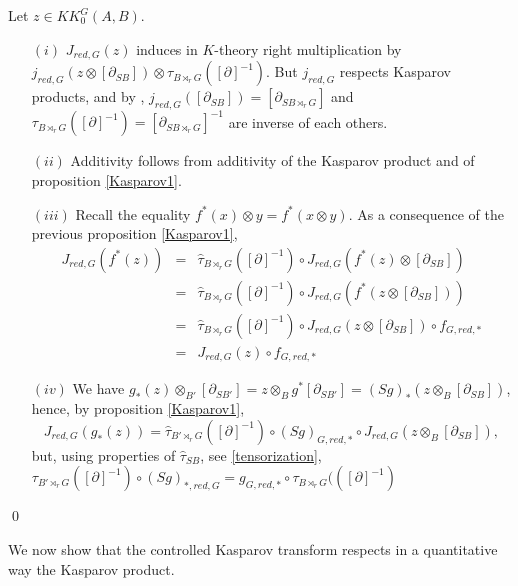 \begin{dem} Let $z\in KK_0^G(A,B)$.
\begin{itemize}
\item[$(i)$] $J_{red,G}(z)$ induces in $K$-theory right multiplication by $j_{red,G}(z\otimes [\partial_{SB}])\otimes \tau_{B\rtimes_r G}([\partial]^{-1})$. But $j_{red, G}$ respects Kasparov products, and by \cite{LeGall}, $j_{red,G}([\partial_{SB}]) = [\partial_{SB\rtimes_r G}]$ and $\tau_{B\rtimes_r G}([\partial]^{-1}) = [\partial_{SB\rtimes_r G }]^{-1}$ are inverse of each others.
\item[$(ii)$] Additivity follows from additivity of the Kasparov product and of proposition \ref{Kasparov1}.
\item[$(iii)$] Recall the equality $f^*(x)\otimes y = f^*(x\otimes y)$. As a consequence of the previous proposition \ref{Kasparov1},
\[\begin{array}{lcl} J_{red,G}(f^*(z)) & = &  \hat\tau_{B\rtimes_r G}([\partial]^{-1}) \circ J_{red,G}(f^*(z)\otimes [\partial_{SB}]) \\
		& = &  \hat\tau_{B\rtimes_r G}([\partial]^{-1}) \circ J_{red,G}(f^*(z\otimes [\partial_{SB}]))\\
		& = &  \hat\tau_{B\rtimes_r G}([\partial]^{-1}) \circ J_{red,G}(z\otimes [\partial_{SB}])\circ f_{G,red,*}\\
		& = & J_{red,G}(z) \circ f_{G,red,*}
\end{array}\]
\item[$(iv)$] We have $g_*(z)\otimes_{B'} [\partial_{SB'}] = z\otimes_B g^{*}[\partial _{SB'}] = (Sg)_{*}(z\otimes_B [\partial _{SB}])$, hence, by proposition \ref{Kasparov1}, 
\[J_{red,G}(g_*(z)) = \hat\tau_{B'\rtimes_r G}([\partial]^{-1}) \circ (Sg)_{G,red,*} \circ J_{red,G}(z\otimes_B [\partial_{SB}]),\]
but, using properties of $\hat\tau_{SB}$, see \ref{tensorization}, $\tau_{B'\rtimes_r G}([\partial]^{-1})\circ (Sg)_{*,red,G} = g_{G,red,*}\circ\tau_{B\rtimes_r G}(([\partial]^{-1})$ 
\end{itemize}
\qed
\end{dem}

We now show that the controlled Kasparov transform respects in a quantitative way the Kasparov product.

